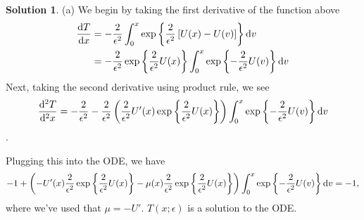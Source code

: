 \documentclass[12pt]{article}
\theoremstyle{definition}
\newtheorem{sol}{Solution}
\theoremstyle{remark}
\def\d{{\rm d}}
\begin{document}
\begin{sol}
    (a) We begin by taking the first derivative of the function above
    \begin{align*}
        \frac{\d T}{\d x} &= -\frac{2}{\epsilon^{2}} \int_{0}^{x} \exp\left\{ \frac{2}{\epsilon^{2}} \left[ U(x) - U(v)\right] \right\} \d v\\
                          &=  -\frac{2}{\epsilon^{2}}\exp\left\{\frac{2}{\epsilon^{2}} U(x)\right\} \int_{0}^{x} \exp\left\{ -\frac{2}{\epsilon^{2}} U(v) \right\} \d v 
    \end{align*}
    Next, taking the second derivative using product rule, we see
    \begin{align*}
        \frac{\d^{2} T}{\d ^{2} x} = -\frac{2}{\epsilon^{2}} -\frac{2}{\epsilon^{2}} \left( \frac{2}{\epsilon^{2}} U'(x)    \exp\left\{\frac{2}{\epsilon^{2}} U(x)\right\} \right) \int_{0}^{x} \exp\left\{ -\frac{2}{\epsilon^{2}} U(v) \right\} \d v         \end{align*}.
\end{sol}
Plugging this into the ODE, we have
\begin{align*}
    -1  + \left(-U'(x)  \frac{2}{\epsilon^{2}} \exp\left\{\frac{2}{\epsilon^{2}} U(x)\right\}  - \mu(x) \frac{2}{\epsilon^{2}} \exp\left\{\frac{2}{\epsilon^{2}} U(x)\right\}  \right) \int_{0}^{x} \exp\left\{ -\frac{2}{\epsilon^{2}} U(v) \right\} \d v = -1,\\
\end{align*}
where we've used that $\mu = - U'$. $T(x;\epsilon)$ is a solution to the ODE.
\end{document}
